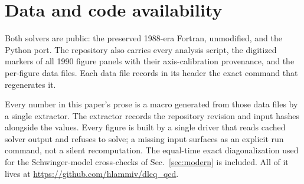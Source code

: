 \section{Data and code availability}
\label{app:data}

Both solvers are public: the preserved 1988-era Fortran, unmodified, and
the Python port.  The repository also carries every analysis script, the
digitized markers of all 1990 figure panels with their axis-calibration
provenance, and the per-figure data files.  Each data file records in its
header the exact command that regenerates it.

Every number in this paper's prose is a macro generated from those data
files by a single extractor.  The extractor records the repository revision
and input hashes alongside the values.  Every figure is built by a single
driver that reads cached solver output and refuses to solve; a missing
input surfaces as an explicit run command, not a silent recomputation.  The
equal-time exact diagonalization used for the Schwinger-model cross-checks
of Sec.~\ref{sec:modern} is included.  All of it lives at
\url{https://github.com/hlammiv/dlcq_qcd}.
